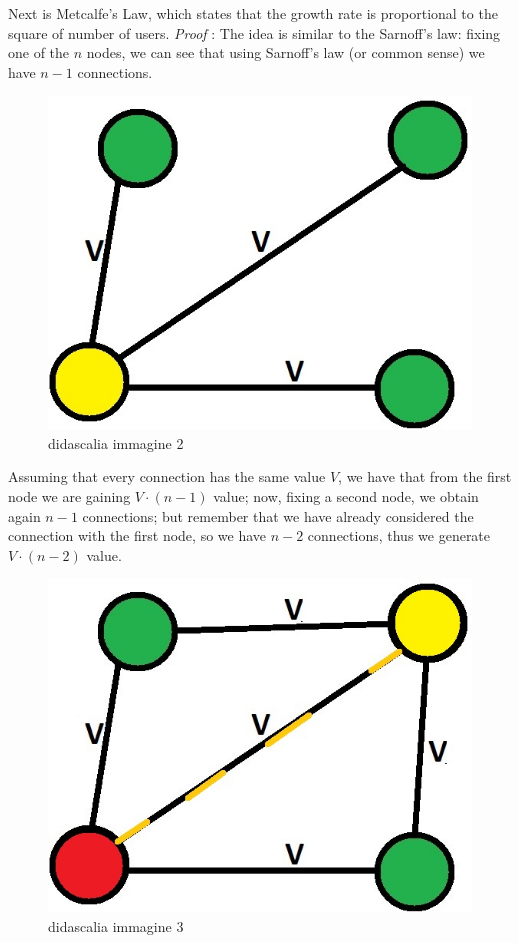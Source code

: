 \documentclass[12pt, a4page]{article}
\begin{document}
Next is Metcalfe's Law, which states that the growth rate is proportional to the square of number of users.\newline
\textit{Proof} : The idea is similar to the Sarnoff's law: fixing one of the $n$ nodes, we can see that using Sarnoff's law (or common sense) we have $n-1$ connections.
\begin{figure}[htp]
\centering
\includegraphics[scale=1.00]{IMAGE2.jpg}
\caption{didascalia immagine 2}
\label{IMAGE2}
\end{figure} \newline
Assuming that every connection has the same value $V$, we have that from the first node we are gaining $V \cdot (n - 1)$ value; now, fixing a second node, we obtain again $n-1$ connections; but remember that we have already considered the connection with the first node, so we have $n-2$ connections, thus we generate $V \cdot (n - 2)$ value. \newline
\begin{figure}[htp]
\centering
\includegraphics[scale=1.00]{IMAGE3.jpg}
\caption{didascalia immagine 3}
\label{IMAGE3}
\end{figure} \newline
\end{document}
